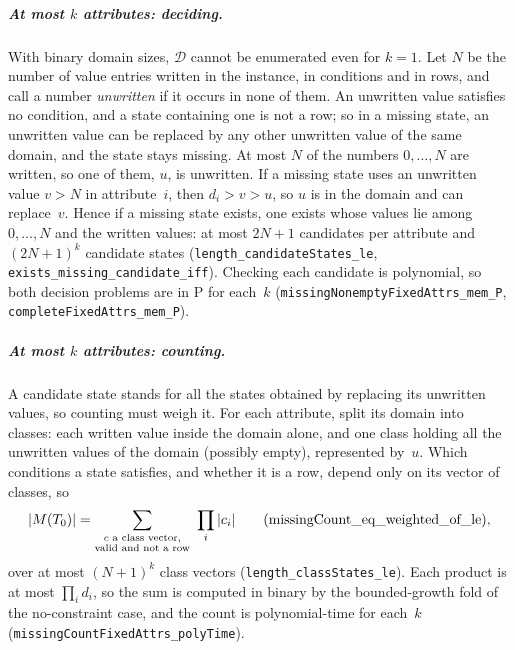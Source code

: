 \documentclass[a4paper,UKenglish,cleveref,autoref,thm-restate]{lipics-v2021}
\begin{document}
\subparagraph*{At most $k$ attributes: deciding.}
With binary domain sizes, $\mathcal{D}$ cannot be enumerated even for $k = 1$. Let $N$ be the
number of value entries written in the instance, in conditions and in rows, and call a number
\emph{unwritten} if it occurs in none of them. An unwritten value satisfies no condition, and a
state containing one is not a row; so in a missing state, an unwritten value can be replaced by
any other unwritten value of the same domain, and the state stays missing. At most $N$ of the
numbers $0, \dots, N$ are written, so one of them, $u$, is unwritten. If a missing state uses an
unwritten value $v > N$ in attribute~$i$, then $d_i > v > u$, so $u$ is in the domain and can
replace~$v$. Hence if a missing state exists, one exists whose values lie among $0, \dots, N$
and the written values: at most $2N+1$ candidates per attribute and $(2N+1)^k$ candidate
states (\lstinline{length_candidateStates_le},
\lstinline{exists_missing_candidate_iff}). Checking each candidate is polynomial, so both decision
problems are in P for each~$k$ (\lstinline{missingNonemptyFixedAttrs_mem_P},
\lstinline{completeFixedAttrs_mem_P}).

\subparagraph*{At most $k$ attributes: counting.}
A candidate state stands for all the states obtained by replacing its unwritten values, so
counting must weigh it. For each attribute, split its domain into classes: each written value
inside the domain alone, and one class holding all the unwritten values of the domain (possibly
empty), represented by~$u$. Which
conditions a state satisfies, and whether it is a row, depend only on its vector of classes, so
\[
|M(T_0)| = \sum_{\substack{c \text{ a class vector,}\\ \text{valid and not a row}}}\
\prod_{i} |c_i|
\qquad (\text{\lstinline{missingCount_eq_weighted_of_le}}),
\]
over at most $(N+1)^k$ class vectors (\lstinline{length_classStates_le}). Each product is at most
$\prod_i d_i$, so the sum is computed in binary by the bounded-growth fold of the
no-constraint case, and the count is polynomial-time for each~$k$
(\lstinline{missingCountFixedAttrs_polyTime}).
\end{document}
